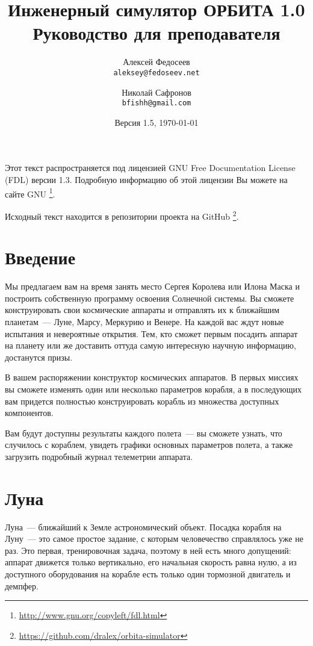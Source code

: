 \documentclass[12pt,a4paper]{article}
\begin{document}
\title{%
  \textbf{Инженерный симулятор ОРБИТА 1.0} \\
    Руководство для преподавателя}

\author{
  Алексей Федосеев\\
  \texttt{aleksey@fedoseev.net}
  \and
  Николай Сафронов\\
  \texttt{bfishh@gmail.com}
}

\date{Версия 1.5, \today}

\maketitle

Этот текст распространяется под лицензией GNU Free Documentation License (FDL) версии
1.3. Подробную информацию об этой лицензии Вы можете на сайте GNU
\footnote{\url{http://www.gnu.org/copyleft/fdl.html}}.

Исходный текст находится в репозитории проекта на GitHub
\footnote{\url{https://github.com/dralex/orbita-simulator}}.

\tableofcontents

\clearpage
\section{Введение}

Мы предлагаем вам на время занять место Сергея Королева или Илона Маска и построить
собственную программу освоения Солнечной системы. Вы сможете конструировать свои
космические аппараты и отправлять их к ближайшим планетам~--- Луне, Марсу, Меркурию и
Венере. На каждой вас ждут новые испытания и невероятные открытия. Тем, кто сможет первым
посадить аппарат на планету или же доставить оттуда самую интересную научную информацию,
достанутся призы.

В вашем распоряжении конструктор космических аппаратов. В первых миссиях вы сможете
изменять один или несколько параметров корабля, а в последующих вам придется полностью
конструировать корабль из множества доступных компонентов.

Вам будут доступны результаты каждого полета~--- вы сможете узнать, что случилось с
кораблем, увидеть графики основных параметров полета, а также загрузить подробный журнал
телеметрии аппарата.

\section{Луна}

Луна~--- ближайший к Земле астрономический объект. Посадка корабля на Луну~--- это самое
простое задание, с которым человечество справлялось уже не раз. Это первая, тренировочная
задача, поэтому в ней есть много допущений: аппарат движется только вертикально, его
начальная скорость равна нулю, а из доступного оборудования на корабле есть только один
тормозной двигатель и демпфер.
\end{document}

